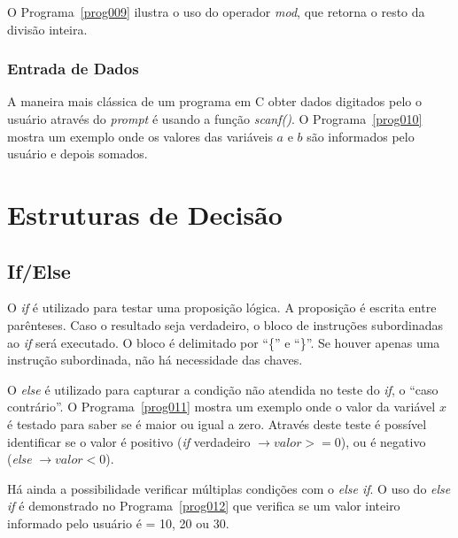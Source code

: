\documentclass[11pt,fleqn]{book} %
\begin{document}
O Programa~\ref{prog009} ilustra o uso do operador \textit{mod}, que retorna o resto da divisão inteira.


\subsubsection{Entrada de Dados}

A maneira mais clássica de um programa em C obter dados digitados pelo o usuário através do \textit{prompt} é usando a função \textit{scanf()}. 
O Programa~\ref{prog010} mostra um exemplo onde os valores das variáveis $a$ e $b$ são informados pelo usuário e depois somados.


\section{Estruturas de Decisão}

\subsection{If/Else}

O \textit{if} é utilizado para testar uma proposição lógica.
A proposição é escrita entre parênteses.
Caso o resultado seja verdadeiro, o bloco de instruções subordinadas ao \textit{if} será executado.
O bloco é delimitado por ``\{'' e ``\}''. 
Se houver apenas uma instrução subordinada, não há necessidade das chaves.

O \textit{else} é utilizado para capturar a condição não atendida no teste do \textit{if}, o ``caso contrário''.
O Programa~\ref{prog011} mostra um exemplo onde o valor da variável $x$ é testado para saber se é maior ou igual a zero.
Através deste teste é possível identificar se o valor é positivo (\textit{if} verdadeiro $\rightarrow valor >= 0 $), ou é negativo (\textit{else} $\rightarrow valor < 0$).


Há ainda a possibilidade verificar múltiplas condições com o \textit{else if}.
O uso do \textit{else if} é demonstrado no Programa~\ref{prog012} que verifica se um valor inteiro informado pelo usuário é = 10, 20 ou 30.

\end{document}
